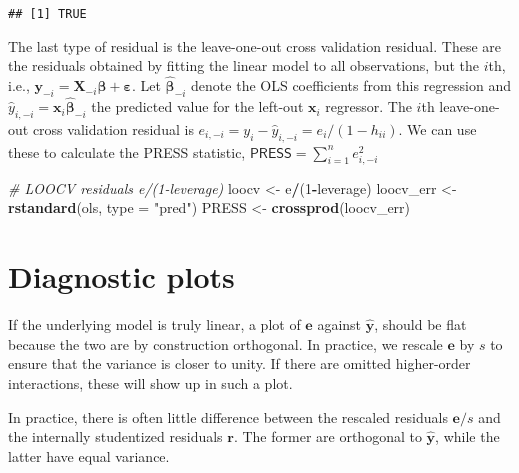 \documentclass[]{book}
\newenvironment{Shaded}{\begin{snugshade}}{\end{snugshade}}
\newcommand{\CommentTok}[1]{\textcolor[rgb]{0.56,0.35,0.01}{\textit{#1}}}
\newcommand{\DataTypeTok}[1]{\textcolor[rgb]{0.13,0.29,0.53}{#1}}
\newcommand{\DecValTok}[1]{\textcolor[rgb]{0.00,0.00,0.81}{#1}}
\newcommand{\KeywordTok}[1]{\textcolor[rgb]{0.13,0.29,0.53}{\textbf{#1}}}
\newcommand{\NormalTok}[1]{#1}
\newcommand{\OperatorTok}[1]{\textcolor[rgb]{0.81,0.36,0.00}{\textbf{#1}}}
\newcommand{\StringTok}[1]{\textcolor[rgb]{0.31,0.60,0.02}{#1}}
\theoremstyle{definition}
\theoremstyle{definition}
\theoremstyle{definition}
\theoremstyle{remark}
\begin{document}
\begin{verbatim}
## [1] TRUE
\end{verbatim}

The last type of residual is the leave-one-out cross validation
residual. These are the residuals obtained by fitting the linear model
to all observations, but the \(i\)th, i.e.,
\(\boldsymbol{y}_{-i}= \mathbf{X}_{-i}\boldsymbol{\beta}+ \boldsymbol{\varepsilon}\).
Let \(\hat{\boldsymbol{\beta}}_{-i}\) denote the OLS coefficients from
this regression and
\(\hat{y}_{i,-i}=\mathbf{x}_i\hat{\boldsymbol{\beta}}_{-i}\) the
predicted value for the left-out \(\mathbf{x}_i\) regressor. The \(i\)th
leave-one-out cross validation residual is
\(e_{i,-i}=y_i - \hat{y}_{i,-i}=e_i/(1-h_{ii})\). We can use these to
calculate the PRESS statistic,
\(\mathsf{PRESS}=\sum_{i=1}^n e_{i, -i}^2\)

\begin{Shaded}
\begin{Highlighting}[]
\CommentTok{# LOOCV residuals e/(1-leverage)}
\NormalTok{loocv <-}\StringTok{ }\NormalTok{e}\OperatorTok{/}\NormalTok{(}\DecValTok{1}\OperatorTok{-}\NormalTok{leverage)}
\NormalTok{loocv_err <-}\StringTok{ }\KeywordTok{rstandard}\NormalTok{(ols, }\DataTypeTok{type =} \StringTok{"pred"}\NormalTok{)}
\NormalTok{PRESS <-}\StringTok{ }\KeywordTok{crossprod}\NormalTok{(loocv_err)}
\end{Highlighting}
\end{Shaded}

\hypertarget{diagnostic-plots}{%
\section{Diagnostic plots}\label{diagnostic-plots}}

If the underlying model is truly linear, a plot of \(\boldsymbol{e}\)
against \(\hat{\boldsymbol{y}}\), should be flat because the two are by
construction orthogonal. In practice, we rescale \(\boldsymbol{e}\) by
\(s\) to ensure that the variance is closer to unity. If there are
omitted higher-order interactions, these will show up in such a plot.

In practice, there is often little difference between the rescaled
residuals \(\boldsymbol{e}/s\) and the internally studentized residuals
\(\boldsymbol{r}\). The former are orthogonal to
\(\hat{\boldsymbol{y}}\), while the latter have equal variance.
\end{document}

